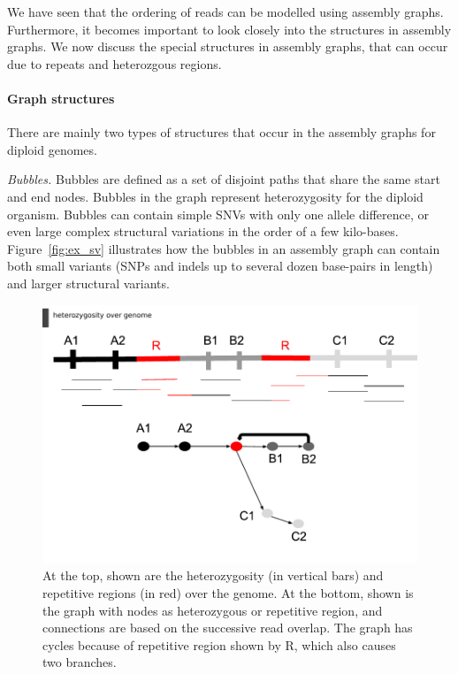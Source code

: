 We have seen that the ordering of reads can be modelled using assembly graphs. Furthermore, it becomes important to look closely into the structures in assembly graphs. 
We now discuss the special structures in assembly graphs, that can occur due to repeats and heterozgous regions.

\paragraph{Graph structures} There are mainly two types of structures that occur in the assembly graphs for diploid genomes.

\textit{Bubbles.}
Bubbles are defined as a set of disjoint paths that share the same start and end nodes.
Bubbles in the graph represent heterozygosity for the diploid organism.
Bubbles can contain simple SNVs with only one allele difference, or even large complex structural variations in the order of a few kilo-bases.  
Figure~\ref{fig:ex_sv} illustrates how the bubbles in an assembly graph can contain both small variants (SNPs and indels up to several dozen base-pairs in length) and larger structural variants.
\begin{figure}[t!]\centering
\includegraphics[width=\columnwidth]{repeats.pdf}
\caption{At the top, shown are the heterozygosity (in vertical bars) and repetitive regions (in red) over the genome. At the bottom, shown is the graph with nodes as heterozygous or repetitive region, and connections are based on the successive read overlap.
The graph has cycles because of repetitive region shown by R, which also causes two branches.}
\label{fig:repeats}
\end{figure}

